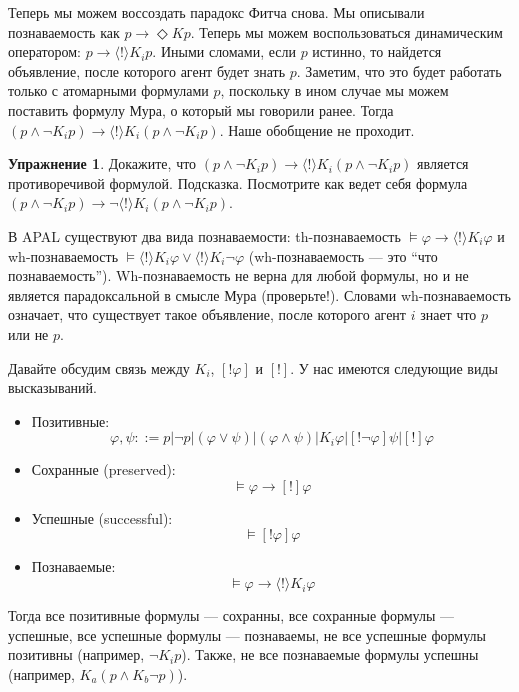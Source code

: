 \documentclass[openany]{book}
\theoremstyle{plain}
\theoremstyle{definition}
\newtheorem{xrc}{Упражнение}[]
\begin{document}
Теперь мы можем воссоздать парадокс Фитча снова. Мы описывали познаваемость как \(p \to \Diamond K p\). Теперь мы можем воспользоваться динамическим оператором: \(p \to \langle ! \rangle K_i p\). Иными сломами, если \(p\) истинно, то найдется объявление, после которого агент будет знать \(p\). Заметим, что это будет работать только с атомарными формулами \(p\), поскольку в ином случае мы можем поставить формулу Мура, о который мы говорили ранее. Тогда \((p \land \neg K_i p) \to \langle ! \rangle K_i (p \land \neg K_i p)\). Наше обобщение не проходит.

\begin{xrc}
    Докажите, что \((p \land \neg K_i p) \to \langle ! \rangle K_i (p \land \neg K_i p)\) является противоречивой формулой. Подсказка. Посмотрите как ведет себя формула \((p \land \neg K_i p) \to \neg \langle ! \rangle K_i (p \land \neg K_i p)\).
\end{xrc}

В APAL существуют два вида познаваемости: th-познаваемость \(\models \varphi \to \langle ! \rangle K_i \varphi\) и wh-познаваемость \(\models \langle ! \rangle K_i \varphi \lor \langle ! \rangle K_i \neg \varphi\) (wh-познаваемость --- это ``что познаваемость''). Wh-познаваемость не верна для любой формулы, но и не является парадоксальной в смысле Мура (проверьте!). Словами wh-познаваемость означает, что существует такое объявление, после которого агент \(i\) знает что \(p\) или не \(p\).

Давайте обсудим связь между \(K_i\), \([! \varphi]\) и \([!]\). У нас имеются следующие виды высказываний. 
\begin{itemize}
    \item Позитивные: \[\varphi, \psi ::= p | \neg p | (\varphi \lor \psi) | (\varphi \land \psi) | K_i \varphi | [!\neg\varphi] \psi | [!] \varphi\]
    \item Сохранные (preserved): \[\models \varphi \to [!] \varphi\]
    \item Успешные (successful): \[\models [! \varphi] \varphi\]
    \item Познаваемые: \[\models \varphi \to \langle ! \rangle K_i \varphi\]
\end{itemize}

Тогда все позитивные формулы --- сохранны, все сохранные формулы --- успешные, все успешные формулы --- познаваемы, не все успешные формулы позитивны (например, \(\neg K_i p\)). Также, не все познаваемые формулы успешны (например, \(K_a (p \land K_b \neg p)\)).
\end{document}
